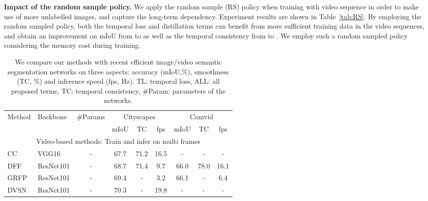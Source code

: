 \documentclass[runningheads]{llncs}
\begin{document}
\noindent\textbf{Impact of the random sample policy.}
We apply the random sample (RS) policy when training with video sequence in order to make use of more unlabelled images, and capture the long-term dependency. Experiment results are shown in Table~\ref{tab:RS}. By employing the random sampled policy, both the temporal loss and distillation terms can benefit from more sufficient training data in the video sequences, and obtain an improvement on mIoU from  to  as well as the temporal consistency from  to . We employ such a random sampled policy considering the memory cost during training.
\begin{table}[h]
\setlength{\abovecaptionskip}{6pt}
    \setlength{\tabcolsep}{3.2pt}
\caption{We compare our methods with recent efficient image/video semantic segmentation networks on three aspects: accuracy (mIoU,\%), smoothness (TC, \%) and inference speed (fps, Hz). TL: temporal loss, ALL: all proposed terms, TC: temporal consistency, \#Param: parameters of the networks.}
\centering

\begin{tabular}{l|l|c|c|c|c|c|c|c}
\toprule

\multirow{2}{*}{Method} & \multirow{2}{*}{Backbone} & \multirow{2}{*}{\#Params} & \multicolumn{3}{c|}{Cityscapes} & \multicolumn{3}{c}{Camvid} \\\cline{4-9}
\multicolumn{1}{c|}{}                        &                           &                         & mIoU     & TC       & fps    & mIoU    & TC     & fps   \\\hline
             \multicolumn{9}{c}{Video-based methods: Train and infer on multi frames}      \\\hline


  CC~\cite{shelhamer2016clockwork}                                          & VGG16                   & -                       & 67.7     & 71.2     & 16.5     & -       & -      & -       \\
                   DFF~\cite{zhu2017deep}                                         & ResNet101                   & -                       & 68.7     & 71.4    & 9.7     & 66.0   & 78.0   & 16.1    \\
                                     GRFP~\cite{nilsson2018semantic}                                        &ResNet101                   & -                       & 69.4     & -        & 3.2     & 66.1    & -      & 6.4    \\
                   DVSN~\cite{xu2018dynamic}                                         & ResNet101                     & -                       & 70.3     & -        & 19.8     & -       & -      & -       \\


\end{tabular}
\end{table}
\end{document}
